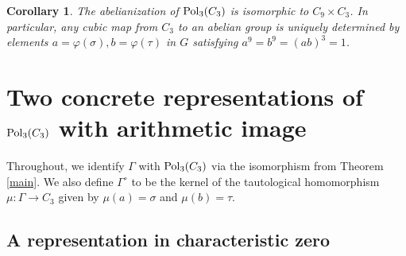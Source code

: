 \documentclass[11pt, a4paper]{amsproc}
\newtheorem{corollary}[cor]{Corollary}
\theoremstyle{remark}
\theoremstyle{plain}
\begin{document}
\begin{corollary}
The abelianization of ${\rm Pol}_3(C_3)$ is isomorphic to $C_9 \times C_3$. In particular, any cubic map from $C_3$ to an abelian group is uniquely determined by elements $a = \varphi(\sigma),b = \varphi(\tau)$ in $G$ satisfying $a^9=b^9=(ab)^3=1$.
\end{corollary}


\section{Two concrete representations of ${\rm Pol}_3(C_3)$ with arithmetic image}
\label{sec:arithmetic}

Throughout, we identify $\Gamma$ with ${\rm Pol}_3(C_3)$ via the isomorphism from Theorem \ref{main}. We also define $\Gamma^{\circ}$ to be the kernel of the tautological homomorphism $\mu \colon \Gamma \to C_3$ given by $\mu(a)=\sigma$ and $\mu(b)=\tau$.

\subsection{A representation in characteristic zero}
\end{document}
